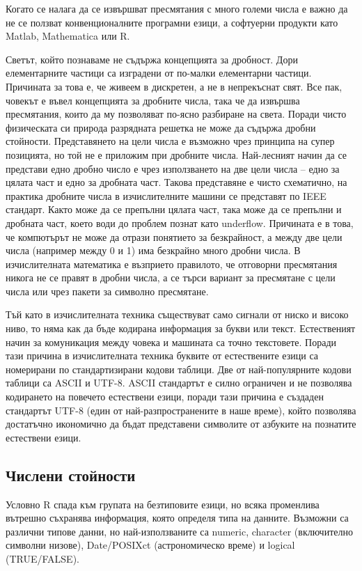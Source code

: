 Когато се налага да се извършват пресмятания с много големи числа е важно да не се ползват конвенционалните програмни езици, а софтуерни продукти като Matlab, Mathematica или R.

Светът, който познаваме не съдържа концепцията за дробност. Дори елементарните частици са изградени от по-малки елементарни частици. Причината за това е, че живеем в дискретен, а не в непрекъснат свят. Все пак, човекът е въвел концепцията за дробните числа, така че да извършва пресмятания, които да му позволяват по-ясно разбиране на света. Поради чисто физическата си природа разрядната решетка не може да съдържа дробни стойности. Представянето на цели числа е възможно чрез принципа на супер позицията, но той не е приложим при дробните числа. Най-лесният начин да се представи едно дробно число е чрез използването на две цели числа – едно за цялата част и едно за дробната част. Такова представяне е чисто схематично, на практика дробните числа в изчислителните машини се представят по IEEE стандарт. Както може да се препълни цялата част, така може да се препълни и дробната част, което води до проблем познат като underflow. Причината е в това, че компютърът не може да отрази понятието за безкрайност, а между две цели числа (например между 0 и 1) има безкрайно много дробни числа. В изчислителната математика е възприето правилото, че отговорни пресмятания никога не се правят в дробни числа, а се търси вариант за пресмятане с цели числа или чрез пакети за символно пресмятане.

Тъй като в изчислителната техника съществуват само сигнали от ниско и високо ниво, то няма как да бъде кодирана информация за букви или текст. Естественият начин за комуникация между човека и машината са точно текстовете. Поради тази причина в изчислителната техника буквите от естествените езици са номерирани по стандартизирани кодови таблици. Две от най-популярните кодови таблици са ASCII и UTF-8. ASCII стандартът е силно ограничен и не позволява кодирането на повечето естествени езици, поради тази причина е създаден стандартът UTF-8 (един от най-разпространените в наше време), който позволява достатъчно икономично да бъдат представени символите от азбуките на познатите естествени езици.

\subsection{Числени стойности}

Условно R спада към групата на безтиповите езици, но всяка променлива вътрешно съхранява информация, която определя типа на данните. Възможни са различни типове данни, но най-използваните са numeric, character (включително символни низове), Date/POSIXct (астрономическо време) и logical (TRUE/FALSE).

